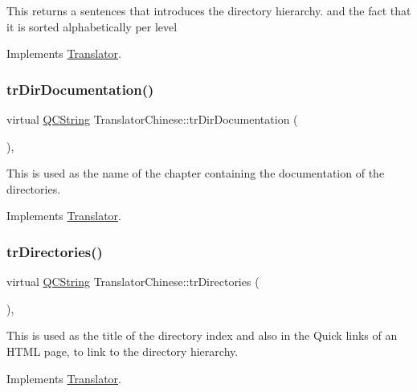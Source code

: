 This returns a sentences that introduces the directory hierarchy. and the fact that it is sorted alphabetically per level 

Implements \mbox{\hyperlink{class_translator}{Translator}}.

\mbox{\label{class_translator_chinese_afe8633c6f4e696e07e0742aefa455880}} 
\subsubsection{\texorpdfstring{trDirDocumentation()}{trDirDocumentation()}}
{\footnotesize\ttfamily virtual \mbox{\hyperlink{class_q_c_string}{Q\+C\+String}} Translator\+Chinese\+::tr\+Dir\+Documentation (\begin{DoxyParamCaption}{ }\end{DoxyParamCaption})\hspace{0.3cm}{\ttfamily [inline]}, {\ttfamily [virtual]}}

This is used as the name of the chapter containing the documentation of the directories. 

Implements \mbox{\hyperlink{class_translator}{Translator}}.

\mbox{\label{class_translator_chinese_a286bf010583e4103b90c6e1b7ad5c8dc}} 
\subsubsection{\texorpdfstring{trDirectories()}{trDirectories()}}
{\footnotesize\ttfamily virtual \mbox{\hyperlink{class_q_c_string}{Q\+C\+String}} Translator\+Chinese\+::tr\+Directories (\begin{DoxyParamCaption}{ }\end{DoxyParamCaption})\hspace{0.3cm}{\ttfamily [inline]}, {\ttfamily [virtual]}}

This is used as the title of the directory index and also in the Quick links of an H\+T\+ML page, to link to the directory hierarchy. 

Implements \mbox{\hyperlink{class_translator}{Translator}}.

